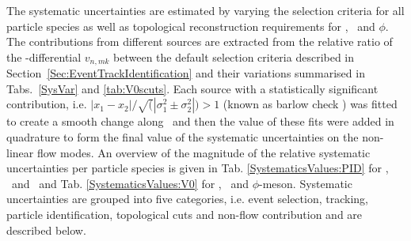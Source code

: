 \documentclass[ALICE,manyauthors]{cernphprep}
\providecommand{\DIFaddtex}[1]{{\protect\color{blue}\uwave{#1}}} %
\providecommand{\DIFaddbegin}{} %
\providecommand{\DIFaddend}{} %
\providecommand{\DIFadd}[1]{\texorpdfstring{\DIFaddtex{#1}}{#1}} %
\begin{document}
The systematic uncertainties are estimated by varying the selection criteria for all particle species as well as topological reconstruction requirements for \Ks, \lambdas~and $\phi$. The contributions from different sources are extracted from the relative ratio of the \pT-differential $v_{n,mk}$ between the default selection criteria described in Section~\ref{Sec:EventTrackIdentification} and their variations summarised in Tabs.~\ref{SysVar} and \ref{tab:V0scuts}. Each source with a statistically significant contribution, i.e. $|x_1 - x_2| / \sqrt(|\sigma_{1}^{2} \pm \sigma_{2}^{2}|)  > 1$ (known as barlow check \DIFaddbegin \DIFadd{\mbox{%
\cite{Barlow:2002yb}}%
}\DIFaddend ) was fitted to create a smooth change along \pT~and then the value of these fits were added in quadrature to form the final value of the systematic uncertainties on the non-linear flow modes. An overview of the magnitude of the relative systematic uncertainties per particle species is given in Tab. \ref{SystematicsValues:PID} for \pion, \kaon~and \proton~and Tab. \ref{SystematicsValues:V0} for \Ks, \lambdas~and $\phi$-meson. Systematic uncertainties are grouped into five categories, i.e. event selection, tracking, particle identification, topological cuts and non-flow contribution and are described below.
\end{document}
